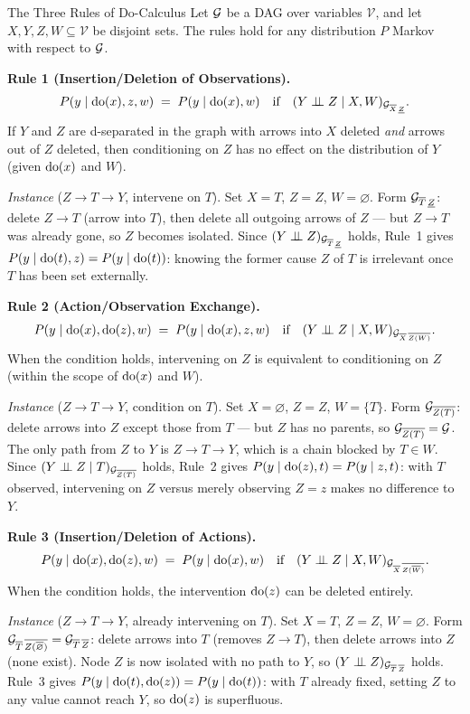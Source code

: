 \documentclass[master.tex]{subfiles}
\begin{document}
\begin{thm}{The Three Rules of Do-Calculus \citep{pearl1995causal}}
\label{w3:thm:docalculus}
Let $\mathcal{G}$ be a DAG over variables $\mathcal{V}$, and let $X, Y, Z, W
\subseteq \mathcal{V}$ be disjoint sets.  The rules hold for any
distribution $P$ Markov with respect to $\mathcal{G}$.

\medskip
\noindent\textbf{Rule 1 (Insertion/Deletion of Observations).}
\[
  P(y \mid \mathrm{do}(x), z, w) \;=\; P(y \mid \mathrm{do}(x), w)
  \quad\text{if}\quad
  (Y \perp\!\!\!\perp Z \mid X, W)_{\mathcal{G}_{\overline{X}\,\underline{Z}}}.
\]
If $Y$ and $Z$ are d-separated in the graph with arrows into $X$ deleted
\emph{and} arrows out of $Z$ deleted, then conditioning on $Z$ has no
effect on the distribution of $Y$ (given $\mathrm{do}(x)$ and $W$).

\smallskip
\noindent\textit{Instance} ($Z \to T \to Y$, intervene on $T$).
Set $X{=}T$, $Z{=}Z$, $W{=}\varnothing$.
Form $\mathcal{G}_{\overline{T}\,\underline{Z}}$: delete $Z\to T$ (arrow into $T$),
then delete all outgoing arrows of $Z$ — but $Z \to T$ was already gone, so $Z$
becomes isolated.  Since $(Y \perp\!\!\!\perp Z)_{\mathcal{G}_{\overline{T}\,\underline{Z}}}$
holds, Rule~1 gives $P(y \mid \mathrm{do}(t), z) = P(y \mid \mathrm{do}(t))$: knowing the
former cause $Z$ of $T$ is irrelevant once $T$ has been set externally.

\medskip
\noindent\textbf{Rule 2 (Action/Observation Exchange).}
\[
  P(y \mid \mathrm{do}(x), \mathrm{do}(z), w) \;=\; P(y \mid \mathrm{do}(x), z, w)
  \quad\text{if}\quad
  (Y \perp\!\!\!\perp Z \mid X, W)_{\mathcal{G}_{\overline{X}\,\overline{Z(W)}}}.
\]
When the condition holds, intervening on $Z$ is equivalent to conditioning
on $Z$ (within the scope of $\mathrm{do}(x)$ and $W$).

\smallskip
\noindent\textit{Instance} ($Z \to T \to Y$, condition on $T$).
Set $X{=}\varnothing$, $Z{=}Z$, $W{=}\{T\}$.
Form $\mathcal{G}_{\overline{Z(T)}}$: delete arrows into $Z$ except those from
$T$ — but $Z$ has no parents, so $\mathcal{G}_{\overline{Z(T)}} = \mathcal{G}$.
The only path from $Z$ to $Y$ is $Z \to T \to Y$, which is a chain
blocked by $T \in W$.  Since $(Y \perp\!\!\!\perp Z \mid T)_{\mathcal{G}_{\overline{Z(T)}}}$
holds, Rule~2 gives $P(y \mid \mathrm{do}(z), t) = P(y \mid z, t)$: with $T$
observed, intervening on $Z$ versus merely observing $Z{=}z$ makes no
difference to $Y$.

\medskip
\noindent\textbf{Rule 3 (Insertion/Deletion of Actions).}
\[
  P(y \mid \mathrm{do}(x), \mathrm{do}(z), w) \;=\; P(y \mid \mathrm{do}(x), w)
  \quad\text{if}\quad
  (Y \perp\!\!\!\perp Z \mid X, W)_{\mathcal{G}_{\overline{X}\,\overline{Z(\overline{W})}}}.
\]
When the condition holds, the intervention $\mathrm{do}(z)$ can be deleted
entirely.

\smallskip
\noindent\textit{Instance} ($Z \to T \to Y$, already intervening on $T$).
Set $X{=}T$, $Z{=}Z$, $W{=}\varnothing$.
Form $\mathcal{G}_{\overline{T}\,\overline{Z(\overline{\varnothing})}} =
\mathcal{G}_{\overline{T}\,\overline{Z}}$: delete arrows into $T$ (removes
$Z \to T$), then delete arrows into $Z$ (none exist).  Node $Z$ is
now isolated with no path to $Y$, so
$(Y \perp\!\!\!\perp Z)_{\mathcal{G}_{\overline{T}\,\overline{Z}}}$ holds.  Rule~3 gives
$P(y \mid \mathrm{do}(t), \mathrm{do}(z)) = P(y \mid \mathrm{do}(t))$: with $T$ already
fixed, setting $Z$ to any value cannot reach $Y$, so $\mathrm{do}(z)$ is
superfluous.
\end{thm}
\end{document}
